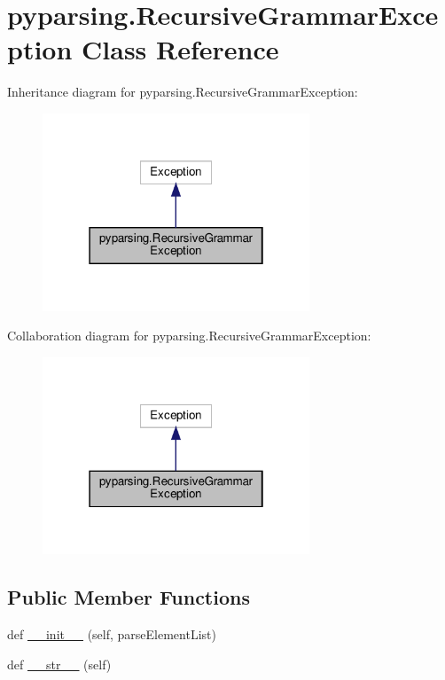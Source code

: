 \hypertarget{classpyparsing_1_1RecursiveGrammarException}{}\section{pyparsing.\+Recursive\+Grammar\+Exception Class Reference}
\label{classpyparsing_1_1RecursiveGrammarException}


Inheritance diagram for pyparsing.\+Recursive\+Grammar\+Exception\+:
\nopagebreak
\begin{figure}[H]
\begin{center}
\leavevmode
\includegraphics[width=226pt]{classpyparsing_1_1RecursiveGrammarException__inherit__graph}
\end{center}
\end{figure}


Collaboration diagram for pyparsing.\+Recursive\+Grammar\+Exception\+:
\nopagebreak
\begin{figure}[H]
\begin{center}
\leavevmode
\includegraphics[width=226pt]{classpyparsing_1_1RecursiveGrammarException__coll__graph}
\end{center}
\end{figure}
\subsection*{Public Member Functions}
\begin{DoxyCompactItemize}
\item 
def \hyperlink{classpyparsing_1_1RecursiveGrammarException_ae549d108f5cf932817b7ed21c44db452}{\+\_\+\+\_\+init\+\_\+\+\_\+} (self, parse\+Element\+List)
\item 
def \hyperlink{classpyparsing_1_1RecursiveGrammarException_a0285ae60e5ee40ac49a13dae0093a07c}{\+\_\+\+\_\+str\+\_\+\+\_\+} (self)
\end{DoxyCompactItemize}
